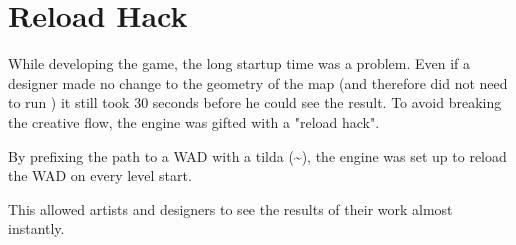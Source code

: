 \section{Reload Hack}
While developing the game, the long startup time was a problem. Even if a designer made no change to the geometry of the map (and therefore did not need to run ) it still took 30 seconds before he could see the result. To avoid breaking the creative flow, the engine was gifted with a "reload hack".\\
\par
By prefixing the path to a WAD with a tilda (\textasciitilde), the engine was set up to reload the WAD on every level start.\\
\par
{}
\par
This allowed artists and designers to see the results of their work almost instantly.
